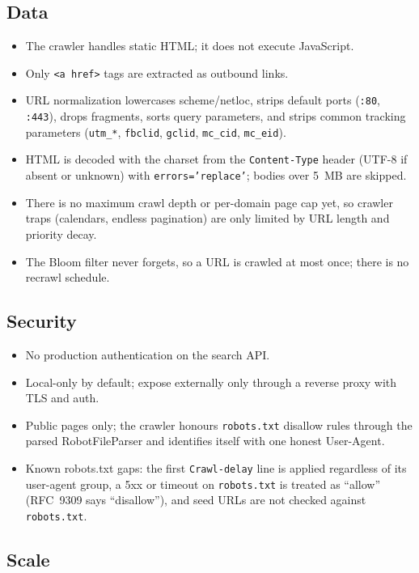 \documentclass[11pt,a4paper]{article}
\newcommand{\code}[1]{\texttt{#1}}
\begin{document}
\subsection{Data}

\begin{itemize}[leftmargin=1.4em]
  \item The crawler handles static HTML; it does not execute JavaScript.
  \item Only \code{<a href>} tags are extracted as outbound links.
  \item URL normalization lowercases scheme/netloc, strips default ports (\code{:80}, \code{:443}), drops fragments, sorts query parameters, and strips common tracking parameters (\code{utm\_*}, \code{fbclid}, \code{gclid}, \code{mc\_cid}, \code{mc\_eid}).
  \item HTML is decoded with the charset from the \code{Content-Type} header (UTF-8 if absent or unknown) with \code{errors='replace'}; bodies over 5~MB are skipped.
  \item There is no maximum crawl depth or per-domain page cap yet, so crawler traps (calendars, endless pagination) are only limited by URL length and priority decay.
  \item The Bloom filter never forgets, so a URL is crawled at most once; there is no recrawl schedule.
\end{itemize}

\subsection{Security}

\begin{itemize}[leftmargin=1.4em]
  \item No production authentication on the search API.
  \item Local-only by default; expose externally only through a reverse proxy with TLS and auth.
  \item Public pages only; the crawler honours \code{robots.txt} disallow rules through the parsed RobotFileParser and identifies itself with one honest User-Agent.
  \item Known robots.txt gaps: the first \code{Crawl-delay} line is applied regardless of its user-agent group, a 5xx or timeout on \code{robots.txt} is treated as ``allow'' (RFC~9309 says ``disallow''), and seed URLs are not checked against \code{robots.txt}.
\end{itemize}

\subsection{Scale}
\end{document}
